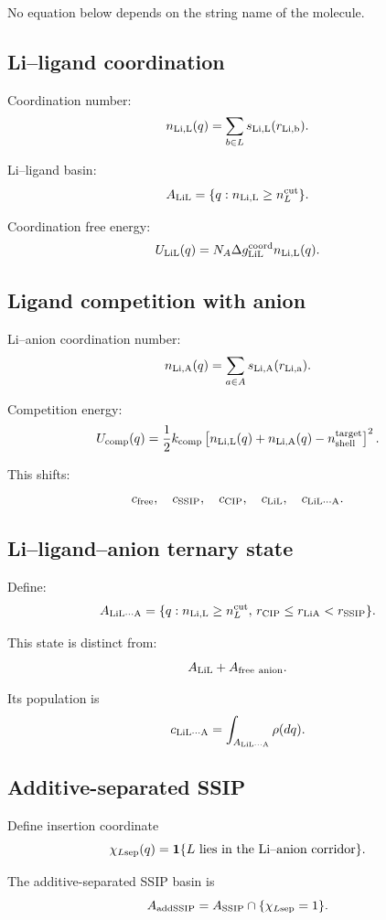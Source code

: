 No equation below depends on the string name of the molecule.

\subsection{Li--ligand coordination}

Coordination number:
\[
n_{\rm Li,L}(q)=\sum_{b\in L}s_{\rm Li,L}(r_{\rm Li,b}).
\]

Li--ligand basin:
\[
A_{\rm LiL}=\{q:n_{\rm Li,L}\ge n_L^{\rm cut}\}.
\]

Coordination free energy:
\[
U_{\rm LiL}(q)
=
N_A\Delta g_{\rm LiL}^{\rm coord}
n_{\rm Li,L}(q).
\]

\subsection{Ligand competition with anion}

Li--anion coordination number:
\[
n_{\rm Li,A}(q)=\sum_{a\in A}s_{\rm Li,A}(r_{\rm Li,a}).
\]

Competition energy:
\[
U_{\rm comp}(q)
=
\frac12 k_{\rm comp}
\left[
n_{\rm Li,L}(q)+n_{\rm Li,A}(q)-n_{\rm shell}^{\rm target}
\right]^2.
\]

This shifts:
\[
c_{\rm free},
\quad
c_{\rm SSIP},
\quad
c_{\rm CIP},
\quad
c_{\rm LiL},
\quad
c_{\rm LiL\cdots A}.
\]

\subsection{Li--ligand--anion ternary state}

Define:
\[
A_{\rm LiL\cdots A}
=
\{
q:
n_{\rm Li,L}\ge n_L^{\rm cut},
\,
r_{\rm CIP}\le r_{\rm LiA}<r_{\rm SSIP}
\}.
\]

This state is distinct from:
\[
A_{\rm LiL}+A_{\rm free\ anion}.
\]

Its population is
\[
c_{\rm LiL\cdots A}
=
\int_{A_{\rm LiL\cdots A}}\rho(dq).
\]

\subsection{Additive-separated SSIP}

Define insertion coordinate
\[
\chi_{L{\rm sep}}(q)
=
\mathbf 1\{
L\text{ lies in the Li--anion corridor}
\}.
\]

The additive-separated SSIP basin is
\[
A_{\rm addSSIP}
=
A_{\rm SSIP}\cap\{\chi_{L{\rm sep}}=1\}.
\]

